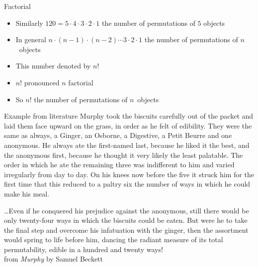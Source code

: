 \documentclass{beamer}
\theoremstyle{definition}
\begin{document}
\begin{frame}{Factorial}
\begin{itemize}
\item Similarly $120=5\cdot 4\cdot 3\cdot 2\cdot 1$
the number of permutations of $5$ objects
\item In general $n\cdot\left(n-1\right)\cdot\left(n-2\right)
\cdots 3\cdot 2\cdot 1$ the number of permutations of $n$~objects
\item This number denoted by \alert{$n!$}
\item $n!$ pronounced \alert{$n$ factorial}
\item So $n!$ the number of permutations of $n$~objects
\end{itemize}
\end{frame}

\begin{frame}{Example from literature}
Murphy took the biscuits carefully out of the packet and laid them face
upward on the grass, in order as he felt of edibility. They were
the same as always, a Ginger, an Osborne, a Digestive, a Petit
Beurre and one anonymous. He always ate the first-named last, because
he liked it the best, and the anonymous first, because he thought
it very likely the least palatable. The order in which he ate the
remaining three was indifferent to him and varied irregularly from
day to day. On his knees now before the five it struck him for the
first time that this reduced to a paltry six the number of ways in
which he could make his meal.
\end{frame}
\begin{frame}
\dots Even if he conquered his
prejudice against the anonymous, still there would be only twenty-four
ways in which the biscuits could be eaten. But were he to take the
final step and overcome his infatuation with the ginger, then the
assortment would spring to life before him, dancing the radiant
measure of its total permutability, edible in a hundred and twenty
ways!\\
\hfill
from {\em Murphy} by Samuel Beckett
\end{frame}
\end{document}
